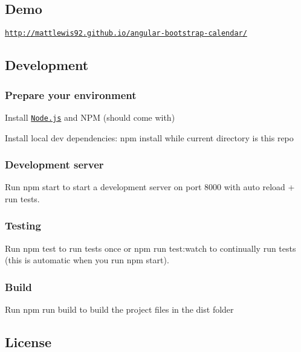 \subsection*{Demo}

\href{http://mattlewis92.github.io/angular-bootstrap-calendar/}{\tt http\+://mattlewis92.\+github.\+io/angular-\/bootstrap-\/calendar/}

\subsection*{Development}

\subsubsection*{Prepare your environment}


\begin{DoxyItemize}
\item Install \href{http://nodejs.org/}{\tt Node.\+js} and N\+PM (should come with)
\item Install local dev dependencies\+: {\ttfamily npm install} while current directory is this repo
\end{DoxyItemize}

\subsubsection*{Development server}

Run {\ttfamily npm start} to start a development server on port 8000 with auto reload + run tests.

\subsubsection*{Testing}

Run {\ttfamily npm test} to run tests once or {\ttfamily npm run test\+:watch} to continually run tests (this is automatic when you run {\ttfamily npm start}).

\subsubsection*{Build}

Run {\ttfamily npm run build} to build the project files in the dist folder

\subsection*{License}

